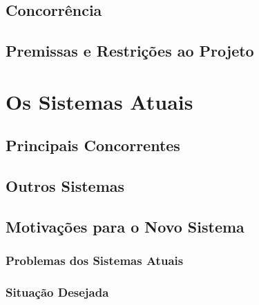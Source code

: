 \documentclass[a4paper]{abntex2}
\begin{document}
\section{Concorrência}

\section{Premissas e Restrições ao Projeto}

\chapter{Os Sistemas Atuais}

\section{Principais Concorrentes}


\section{Outros Sistemas}

\section{Motivações para o Novo Sistema}

\subsection{Problemas dos Sistemas Atuais}

\subsection{Situação Desejada}
\end{document}
